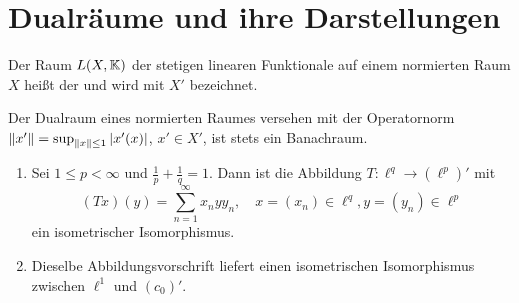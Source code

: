 \chapter{Dualr\"aume und ihre Darstellungen}
\begin{definition}
	Der Raum $ L(X,\mathbb{K}) $ der stetigen linearen Funktionale auf einem normierten Raum $ X $ hei\ss t der  und wird mit $ X' $ bezeichnet.
\end{definition}
\begin{bemerkung*}
	Der Dualraum eines normierten Raumes versehen mit der Operatornorm $ \left\|x'\right\|=\sup_{\left\|x\right\|\leq 1} |x'(x)|$, $ x'\in X' $, ist stets ein Banachraum.
\end{bemerkung*}
\begin{satz}
	\bullshit
	\begin{enumerate}
		\item Sei $ 1\leq p<\infty $ und $ \frac{1}{p}+\frac{1}{q}=1 $. Dann ist die Abbildung $ T\colon\ell^q\rightarrow(\ell^p)' $ mit
		\[ (Tx)(y)=\sum_{n=1}^{\infty}x_nyy_n,\quad x=(x_n)\in\ell^q,y=(y_n)\in\ell^p \]
		ein isometrischer Isomorphismus.
		\item Dieselbe Abbildungsvorschrift liefert einen isometrischen Isomorphismus zwischen $ \ell^1 $ und $ (c_0)' $. 
	\end{enumerate}
\end{satz}
